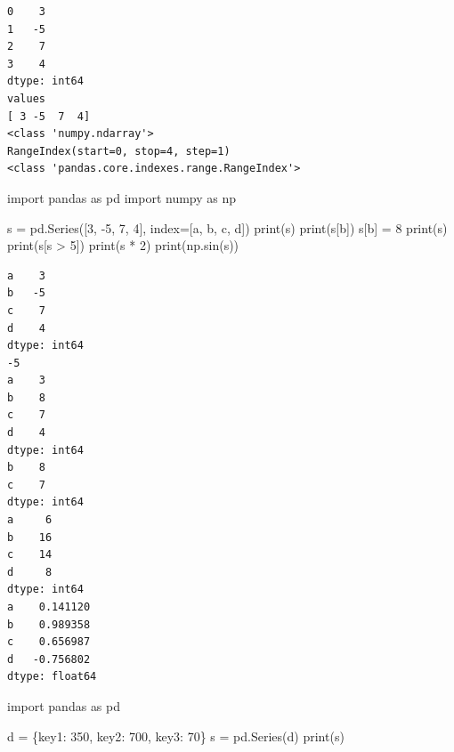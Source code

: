 \documentclass[
  polish,
  letterpaper,
  DIV=11,
  numbers=noendperiod]{scrreprt}
\newenvironment{Shaded}{\begin{snugshade}}{\end{snugshade}}
\newcommand{\BuiltInTok}[1]{\textcolor[rgb]{0.00,0.23,0.31}{#1}}
\newcommand{\DecValTok}[1]{\textcolor[rgb]{0.68,0.00,0.00}{#1}}
\newcommand{\ImportTok}[1]{\textcolor[rgb]{0.00,0.46,0.62}{#1}}
\newcommand{\NormalTok}[1]{\textcolor[rgb]{0.00,0.23,0.31}{#1}}
\newcommand{\OperatorTok}[1]{\textcolor[rgb]{0.37,0.37,0.37}{#1}}
\newcommand{\StringTok}[1]{\textcolor[rgb]{0.13,0.47,0.30}{#1}}
\begin{document}
\begin{verbatim}
0    3
1   -5
2    7
3    4
dtype: int64
values
[ 3 -5  7  4]
<class 'numpy.ndarray'>
RangeIndex(start=0, stop=4, step=1)
<class 'pandas.core.indexes.range.RangeIndex'>
\end{verbatim}

\begin{Shaded}
\begin{Highlighting}[]
\ImportTok{import}\NormalTok{ pandas }\ImportTok{as}\NormalTok{ pd}
\ImportTok{import}\NormalTok{ numpy }\ImportTok{as}\NormalTok{ np}

\NormalTok{s }\OperatorTok{=}\NormalTok{ pd.Series([}\DecValTok{3}\NormalTok{, }\OperatorTok{{-}}\DecValTok{5}\NormalTok{, }\DecValTok{7}\NormalTok{, }\DecValTok{4}\NormalTok{], index}\OperatorTok{=}\NormalTok{[}\StringTok{\textquotesingle{}a\textquotesingle{}}\NormalTok{, }\StringTok{\textquotesingle{}b\textquotesingle{}}\NormalTok{, }\StringTok{\textquotesingle{}c\textquotesingle{}}\NormalTok{, }\StringTok{\textquotesingle{}d\textquotesingle{}}\NormalTok{])}
\BuiltInTok{print}\NormalTok{(s)}
\BuiltInTok{print}\NormalTok{(s[}\StringTok{\textquotesingle{}b\textquotesingle{}}\NormalTok{])}
\NormalTok{s[}\StringTok{\textquotesingle{}b\textquotesingle{}}\NormalTok{] }\OperatorTok{=} \DecValTok{8}
\BuiltInTok{print}\NormalTok{(s)}
\BuiltInTok{print}\NormalTok{(s[s }\OperatorTok{\textgreater{}} \DecValTok{5}\NormalTok{])}
\BuiltInTok{print}\NormalTok{(s }\OperatorTok{*} \DecValTok{2}\NormalTok{)}
\BuiltInTok{print}\NormalTok{(np.sin(s))}
\end{Highlighting}
\end{Shaded}

\begin{verbatim}
a    3
b   -5
c    7
d    4
dtype: int64
-5
a    3
b    8
c    7
d    4
dtype: int64
b    8
c    7
dtype: int64
a     6
b    16
c    14
d     8
dtype: int64
a    0.141120
b    0.989358
c    0.656987
d   -0.756802
dtype: float64
\end{verbatim}

\begin{Shaded}
\begin{Highlighting}[]
\ImportTok{import}\NormalTok{ pandas }\ImportTok{as}\NormalTok{ pd}

\NormalTok{d }\OperatorTok{=}\NormalTok{ \{}\StringTok{\textquotesingle{}key1\textquotesingle{}}\NormalTok{: }\DecValTok{350}\NormalTok{, }\StringTok{\textquotesingle{}key2\textquotesingle{}}\NormalTok{: }\DecValTok{700}\NormalTok{, }\StringTok{\textquotesingle{}key3\textquotesingle{}}\NormalTok{: }\DecValTok{70}\NormalTok{\}}
\NormalTok{s }\OperatorTok{=}\NormalTok{ pd.Series(d)}
\BuiltInTok{print}\NormalTok{(s)}
\end{Highlighting}
\end{Shaded}
\end{document}
